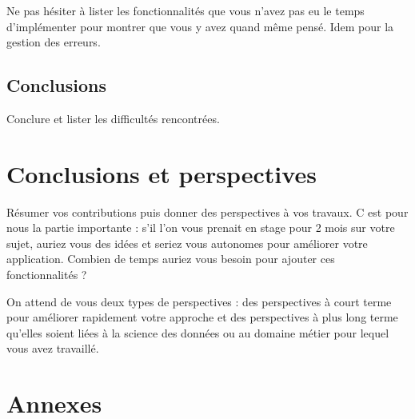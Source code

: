 \documentclass[mstat,12pt]{unswthesis}
\begin{document}
Ne pas hésiter à lister les fonctionnalités que vous n’avez pas eu le temps d’implémenter pour montrer que vous y avez quand même pensé. Idem pour la gestion des erreurs.

\hypertarget{concluBD}{%
\section{Conclusions}\label{concluDescription}}

Conclure et lister les difficultés rencontrées.



\hypertarget{conclusion-et-perspectives}{%
\chapter{Conclusions et perspectives}\label{conclusion-et-perspectives}}




Résumer vos contributions puis donner des perspectives à vos travaux. C est pour nous la partie importante : s’il l’on vous prenait en stage pour 2 mois sur votre sujet, auriez vous des idées et seriez vous autonomes pour améliorer votre application. 
Combien de temps auriez vous besoin pour ajouter ces fonctionnalités ? 

On attend de vous deux types de perspectives : des perspectives à court
terme pour améliorer rapidement votre approche et des perspectives à
plus long terme qu'elles soient liées à la science des données ou au
domaine métier pour lequel vous avez travaillé.



\hypertarget{annexes}{%
\chapter*{Annexes}\label{annexes}}
\end{document}
